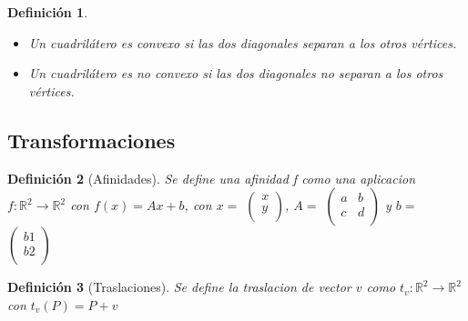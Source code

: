 \documentclass[11pt, a4paper, titlepage]{article}
\newcommand{\R}{\mathbb{R}}
\theoremstyle{theorem-style}
\theoremstyle{definition-style}
\newtheorem{ndef}{Definición}[section]
\theoremstyle{remark-style}
\theoremstyle{example-style}
\begin{document}
\begin{ndef}
  \begin{itemize}
  \item Un cuadrilátero es convexo si las dos diagonales separan a los otros vértices.\\
  \item Un cuadrilátero es no convexo si las dos diagonales no separan a los otros vértices.
  \end{itemize}
\end{ndef}

\subsection{Transformaciones}

\begin{ndef}[Afinidades]
  Se define una afinidad f como una aplicacion $f:\R^2 \rightarrow \R^2$ con $f(x) = Ax + b$, con $x =$ $\begin{pmatrix}
    x\\
    y\\
  \end{pmatrix}$, $A =$ $\begin{pmatrix}
    a & b\\
    c & d\\
  \end{pmatrix}$
  y $b =$ $\begin{pmatrix}
    b1\\
    b2\\
  \end{pmatrix}$


\end{ndef}

\begin{ndef}[Traslaciones]
  Se define la traslacion de vector $v$ como $t_v: \R^2 \rightarrow \R^2$ con $t_v(P) = P + v$
\end{ndef}
\end{document}
